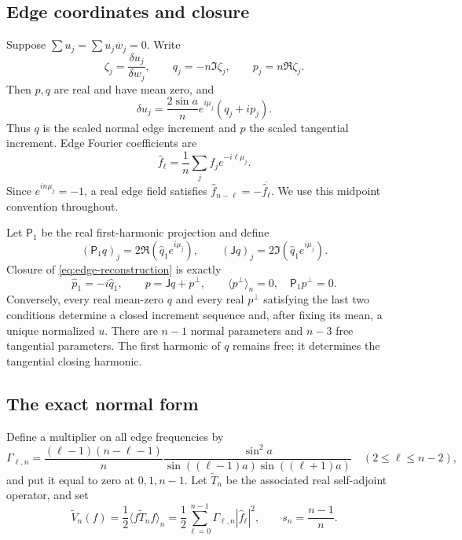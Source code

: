 \documentclass[11pt,reqno]{amsart}
\numberwithin{equation}{section}
\theoremstyle{definition}
\theoremstyle{remark}
\newcommand{\av}[1]{\langle #1\rangle_n}
\newcommand{\dd}{\delta}
\begin{document}
\subsection{Edge coordinates and closure}
Suppose $\sum u_j=\sum u_j\overline w_j=0$. Write
\begin{equation}\label{eq:edge-variables}
 \zeta_j=\frac{\dd u_j}{\dd w_j},\qquad
 q_j=-n\Im\zeta_j,\qquad p_j=n\Re\zeta_j.
\end{equation}
Then $p,q$ are real and have mean zero, and
\begin{equation}\label{eq:edge-reconstruction}
 \dd u_j=\frac{2\sin a}{n}e^{i\mu_j}(q_j+ip_j).
\end{equation}
Thus $q$ is the scaled normal edge increment and $p$ the scaled tangential increment. Edge Fourier coefficients are
\[
 \widehat f_\ell=\frac1n\sum_j f_j e^{-i\ell\mu_j}.
\]
Since $e^{in\mu_j}=-1$, a real edge field satisfies $\widehat f_{n-\ell}=-\overline{\widehat f_\ell}$. We use this midpoint convention throughout.

Let $\mathsf P_1$ be the real first-harmonic projection and define
\[
 (\mathsf P_1q)_j=2\Re(\widehat q_1e^{i\mu_j}),\qquad
 (\mathsf Jq)_j=2\Im(\widehat q_1e^{i\mu_j}).
\]
Closure of \eqref{eq:edge-reconstruction} is exactly
\begin{equation}\label{eq:closure-harmonic}
 \widehat p_1=-i\widehat q_1,
 \qquad p=\mathsf Jq+p^\perp,
 \qquad \av{p^\perp}=0,\quad \mathsf P_1p^\perp=0.
\end{equation}
Conversely, every real mean-zero $q$ and every real $p^\perp$ satisfying the last two conditions determine a closed increment sequence and, after fixing its mean, a unique normalized $u$. There are $n-1$ normal parameters and $n-3$ free tangential parameters. The first harmonic of $q$ remains free; it determines the tangential closing harmonic.

\subsection{The exact normal form}
Define a multiplier on all edge frequencies by
\begin{equation}\label{eq:full-multiplier}
 \Gamma_{\ell,n}=
 \frac{(\ell-1)(n-\ell-1)}n
 \frac{\sin^2a}{\sin((\ell-1)a)\sin((\ell+1)a)}
 \quad(2\le\ell\le n-2),
\end{equation}
and put it equal to zero at $0,1,n-1$. Let $\widetilde T_n$ be the associated real self-adjoint operator, and set
\[
 \widetilde V_n(f)=\frac12\av{f\widetilde T_nf}
 =\frac12\sum_{\ell=0}^{n-1}\Gamma_{\ell,n}|\widehat f_\ell|^2,
 \qquad s_n=\frac{n-1}{n}.
\]
\end{document}
